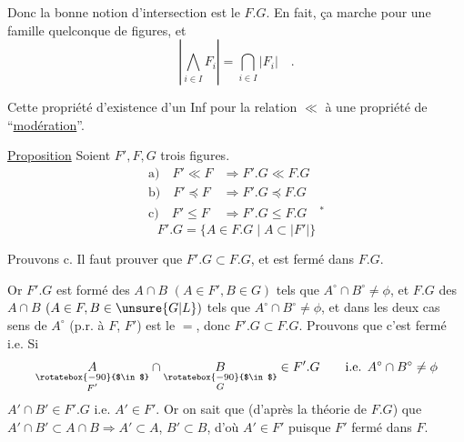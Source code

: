 Donc la bonne notion d'intersection est le $F.G$. En fait, ça marche pour une famille quelconque de figures, et
\[
 \left|\bigwedge_{i\in I} F_i\right|=\bigcap_{i\in I}|F_i|\quad .
\]

Cette propriété d'existence d'un Inf pour la relation $\ll$   à une propriété de ``\uline{modération}''.


\uline{Proposition} Soient $F',F,G$ trois figures.
\[
\begin{aligned}
 \text{a)}\quad F'\ll F&\Longrightarrow F'.G\ll F.G\\
 \text{b)}\quad F'\preceq F&\Longrightarrow F'.G\preceq F.G\\
 \text{c)}\quad F'\leq F&\Longrightarrow F'.G\leq F.G\quad{}^{*}
\end{aligned}
\]
\[
 F'.G=\{A\in F.G\mid A\subset |F'|\}
\]

Prouvons c. Il faut prouver que  $F'.G\subset F.G$, et est fermé dans $F.G$.

 Or $F'.G$ est formé des $A\cap B$ $(A\in F',B\in G)$ tels que $A^\circ\cap B^\circ\ne\phi$, et $F.G$ des $A\cap B$ $(A\in F,B\in \unsure{G|L})$ tels que $A^\circ\cap B^\circ\ne\phi$, et dans les deux cas  sens de $A^\circ$ (p.r. à $F$,  $F'$) est le $=$, donc $F'.G\subset F.G$. Prouvons que c'est fermé i.e.
Si 
\[
 \underset{\substack{\rotatebox{-90}{$\in$}\\ F'}}{A}\cap
 \underset{\substack{\rotatebox{-90}{$\in$}\\ G}}{B}\in F'.G\qquad
 \text{i.e. } A^\circ\cap B^\circ\ne\phi
\]
$A'\cap B'\in F'.G$ i.e. $A'\in F'$. Or on sait que (d'après la théorie de $F.G$) que $A'\cap B'\subset A\cap B\Longrightarrow A'\subset A$, $B'\subset B$, d'où $A'\in F'$ puisque $F'$ fermé dans $F$.

